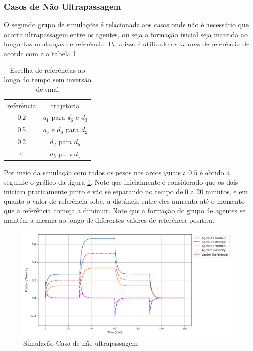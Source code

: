 \subsubsection{Casos de Não Ultrapassagem}
O segundo grupo de simulações é relacionado aos casos onde não é necessário que ocorra ultrapassagem entre os agentes, ou seja a formação inicial seja mantida ao longo das mudanças de referência. Para isso é utilizado os valores de referência de acordo com a a tabela \ref{tab:caso1_sem_utrapassagem}
\begin{table}[ht]
    \centering
    \begin{tabular}{c|c}                 
         referência & trajetória  \\ \cline{1-2}
         0.2 & $d_1$ para $d_6$ e $d_3$  \\ \cline{1-2}
         0.5 & $d_3$ e $d_6$ para $d_2$ \\ \cline{1-2}
         0.2 & $d_2$ para $d_5$  \\ \cline{1-2}
            0 & $d_5$ para $d_1$ \\     
    \end{tabular}
    \caption{Escolha de referências ao longo do tempo sem inversão de sinal}
    \label{tab:caso1_sem_utrapassagem}
\end{table}

Por meio da simulação com todos os pesos nos arcos iguais a $0.5$ é obtido a seguinte o gráfico da figura \ref{fig:case4}. Note que inicialmente é considerado que os dois iniciam praticamente junto e vão se separando no tempo de 0 a 20 minutos, e em quanto o valor de referência sobe, a distância entre eles aumenta até o momento que a referência começa a diminuir. Note que a formação do grupo de agentes se mantém a mesma ao longo de diferentes valores de referência positiva.

\begin{figure}[ht]
    \centering
    \caption{Simulação Caso de não ultrapassagem}
    \label{fig:case4}
    \includegraphics[width=1\linewidth]{figures/Simulation/Cooperativo/case4_fg2.png}
\end{figure}

